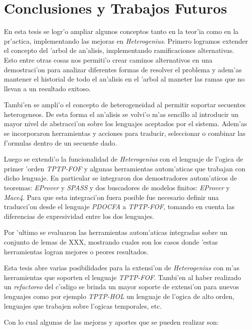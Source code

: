 \chapter{Conclusiones y Trabajos Futuros}

En esta tesis se logr'o ampliar algunos conceptos tanto en la teor'ia como en la pr'actica, implementando las mejoras en \textit{Heterogenius}. Primero logramos extender el concepto del 'arbol de an'alisis, implementando ramificaciones alternativas. Esto entre otras cosas nos permiti'o crear caminos alternativos en una demostraci'on para analizar diferentes formas de resolver el problema y adem'as mantener el historial de todo el an'alisis en el 'arbol al maneter las ramas que no llevan a un resultado exitoso.

Tambi'en se ampli'o el concepto de heterogeneidad al permitir soportar secuentes heterogeneos. De esta forma el an'alisis se volvi'o m'as sencillo al introducir un mayor nivel de abstracci'on sobre los lenguajes aceptados por el sistema. Adem'as se incorporaron herramientas y acciones para traducir, seleccionar o combinar las f'ormulas dentro de un secuente dado.

Luego se extendi'o la funcionalidad de \textit{Heterogenius} con el lenguaje de l'ogica de primer 'orden \textit{TPTP-FOF} y algunas herramientas autom'aticas que trabajan con dicho lenguaje. En particular se integraron dos demostradores autom'aticos de teoremas: \textit{EProver} y \textit{SPASS} y dos buscadores de modelos finitos: \textit{EProver} y \textit{Mace4}. Para que esta integraci'on fuera posible fue necesario definir una traducci'on desde el lenguaje \textit{PDOCFA} a \textit{TPTP-FOF}, tomando en cuenta las diferencias de expresividad entre los dos lenguajes.

Por 'ultimo se evaluaron las herramientas autom'aticas integradas sobre un conjunto de lemas de XXX, mostrando cuales son los casos donde 'estas herramientas logran mejores o peores resultados.

Esta tesis abre varias posibilidades para la extensi'on de \textit{Heterogenius} con m'as herramientas que soporten el lenguaje \textit{TPTP-FOF}. Tambi'en al haber realizado un \textit{refactoreo} del c'odigo se brinda un mayor soporte de extensi'on para nuevos lenguajes como por ejemplo \textit{TPTP-HOL} un lenguaje de l'ogica de alto orden, lenguajes que trabajen sobre l'ogicas temporales, etc.

Con lo cual algunas de las mejoras y aportes que se pueden realizar son:

